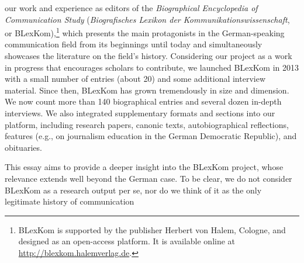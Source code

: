 \documentclass{tufte-handout}
\begin{document}
\begin{titlepage}
\begin{fullwidth}
\end{fullwidth}

\vspace*{1em}


 our work and experience as editors of the
\emph{Biographical Encyclopedia of Communication Study}
(\emph{Biografisches Lexikon der Kommunikationswissenschaft}, or
BLexKom),\footnote{BLexKom is supported by the publisher Herbert von Halem, Cologne, and
  designed as an open-access platform. It is available online at
  \url{http://blexkom.halemverlag.de}.
} which presents the main
protagonists in the German-speaking communication field from its
beginnings until today and simultaneously showcases the literature on
the field's history. Considering our project as a work in progress that
encourages scholars to contribute, we launched BLexKom in 2013 with a
small number of entries (about 20) and some additional interview
material. Since then, BLexKom has grown tremendously in size and
dimension. We now count more than 140 biographical entries and several
dozen in-depth interviews. We also integrated supplementary formats and
sections into our platform, including research papers, canonic texts,
autobiographical reflections, features (e.g., on journalism education in
the German Democratic Republic), and obituaries.

This essay aims to provide a deeper insight into the BLexKom project,
whose relevance extends well beyond the German case. To be clear, we do
not consider BLexKom as a research output per se, nor do we think of it
as the only legitimate history of communication
\enlargethispage{2\baselineskip}

\vspace*{2em}





 \end{titlepage}
\end{document}
